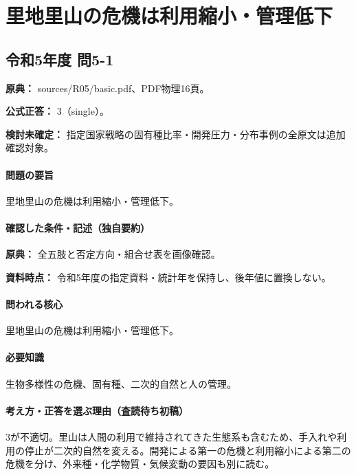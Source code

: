 \section{里地里山の危機は利用縮小・管理低下}

\subsection{令和5年度 問5-1}
\label{q:r05-reg-basic-5-1}

\noindent\textbf{原典：} sources/R05/basic.pdf、PDF物理16頁。

\textbf{公式正答：} 3（single）。

\par\textbf{検討未確定：} 指定国家戦略の固有種比率・開発圧力・分布事例の全原文は追加確認対象。

\paragraph{問題の要旨} 里地里山の危機は利用縮小・管理低下。

\paragraph{確認した条件・記述（独自要約）}\mbox{}\par

\noindent\textbf{原典：} 全五肢と否定方向・組合せ表を画像確認。\par

\noindent\textbf{資料時点：} 令和5年度の指定資料・統計年を保持し、後年値に置換しない。\par

\paragraph{問われる核心} 里地里山の危機は利用縮小・管理低下。

\paragraph{必要知識} 生物多様性の危機、固有種、二次的自然と人の管理。

\paragraph{考え方・正答を選ぶ理由（査読待ち初稿）} 3が不適切。里山は人間の利用で維持されてきた生態系も含むため、手入れや利用の停止が二次的自然を変える。開発による第一の危機と利用縮小による第二の危機を分け、外来種・化学物質・気候変動の要因も別に読む。

